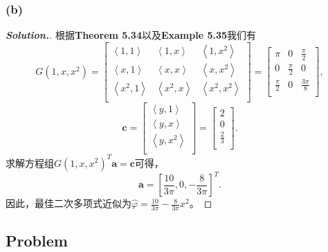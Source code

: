 \documentclass{ctexart}
\begin{document}
\begin{sloppypar}
\subsubsection*{(b)}
\begin{proof}[\textbf{Solution.}]
根据\textbf{Theorem 5.34}以及\textbf{Example 5.35}我们有
$$
G(1,x,x^2) = 
\begin{bmatrix}
    \left \langle 1,1 \right \rangle & \left \langle 1,x \right \rangle & \left \langle 1,x^2 \right \rangle \\
    \left \langle x,1 \right \rangle & \left \langle x,x \right \rangle & \left \langle x,x^2 \right \rangle\\
    \left \langle x^2,1 \right \rangle& \left \langle x^2,x \right \rangle & \left \langle x^2,x^2 \right \rangle\\
\end{bmatrix}
 = 
\begin{bmatrix}
    \pi & 0 & \frac{\pi}{2} \\
    0 & \frac{\pi}{2} & 0\\
    \frac{\pi}{2} & 0 & \frac{3\pi}{8}\\
\end{bmatrix}
,
$$
$$
\mathbf{c} = 
\begin{bmatrix}
    \left \langle y,1 \right \rangle\\
    \left \langle y,x \right \rangle \\
    \left \langle y,x^2 \right \rangle\\
\end{bmatrix}
 = 
\begin{bmatrix}
    2 \\
    0 \\
    \frac{2}{3} \\
\end{bmatrix}
.
$$
求解方程组$G(1,x,x^2)^T \mathbf{a} = \mathbf{c}$可得，
\begin{equation}
    \mathbf{a} = \left[\frac{10}{3\pi} ,0,- \frac{8}{3\pi}\right]^T.
\end{equation}
因此，最佳二次多项式近似为$\hat{\varphi} = \frac{10}{3\pi} - \frac{8}{3\pi}x^2$。
\end{proof}


\subsection*{Problem \uppercase\expandafter{}}

\end{sloppypar}
\end{document}

